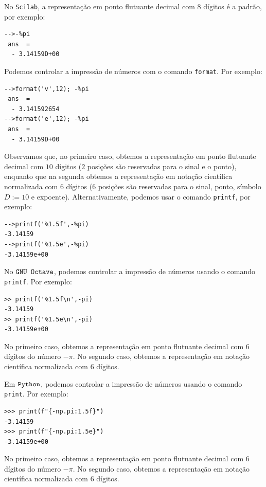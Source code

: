 \ifisscilab
\begin{obs}
No \verb+Scilab+, a representação em ponto flutuante decimal com $8$ dígitos é a padrão, por exemplo:
\begin{verbatim}
-->-%pi
 ans  =
  - 3.14159D+00
\end{verbatim}
Podemos controlar a impressão de números com o comando \verb+format+. Por exemplo:
\begin{verbatim}
-->format('v',12); -%pi
 ans  =
  - 3.141592654
-->format('e',12); -%pi
 ans  =
  - 3.14159D+00
\end{verbatim}
Observamos que, no primeiro caso, obtemos a representação em ponto flutuante decimal com $10$ dígitos ($2$ posições são reservadas para o sinal e o ponto), enquanto que na segunda obtemos a representação em notação científica normalizada com $6$ dígitos ($6$ posições são reservadas para o sinal, ponto, símbolo $D := 10$ e expoente). Alternativamente, podemos usar o comando \verb+printf+, por exemplo:
\begin{verbatim}
-->printf('%1.5f',-%pi)
-3.14159
-->printf('%1.5e',-%pi)
-3.14159e+00
\end{verbatim}
\end{obs}
\fi
\ifisoctave
\begin{obs}
No $\verb+GNU Octave+$, podemos controlar a impressão de números usando o comando \verb+printf+. Por exemplo:
\begin{verbatim}
>> printf('%1.5f\n',-pi)
-3.14159
>> printf('%1.5e\n',-pi)
-3.14159e+00
\end{verbatim}
No primeiro caso, obtemos a representação em ponto flutuante decimal com $6$ dígitos do número $-\pi$. No segundo caso, obtemos a representação em notação científica normalizada com $6$ dígitos.
\end{obs}
\fi
\ifispython
\begin{obs}
Em $\verb+Python+$, podemos controlar a impressão de números usando o comando \verb+print+. Por exemplo:
\begin{verbatim}
>>> print(f"{-np.pi:1.5f}")
-3.14159
>>> print(f"{-np.pi:1.5e}")
-3.14159e+00
\end{verbatim}
No primeiro caso, obtemos a representação em ponto flutuante decimal com $6$ dígitos do número $-\pi$. No segundo caso, obtemos a representação em notação científica normalizada com $6$ dígitos.
\end{obs}
\fi

